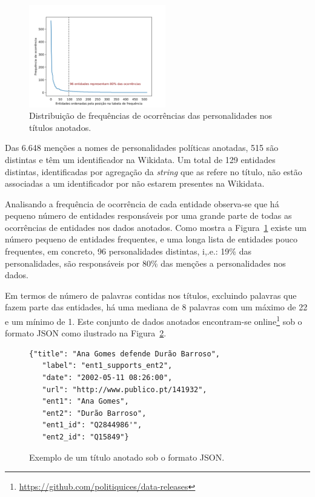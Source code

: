 \documentclass[a4paper, twocolumn, 11pt, twoside]{article}
\begin{document}


\begin{figure}
  \centering
    \includegraphics[width=0.53\textwidth]{power_law_ent_freq.png}
  \caption{Distribuição de frequências de ocorrências das personalidades nos títulos anotados.}
  \label{fig:ent_power_law}
\end{figure}

Das 6.648 menções a nomes de personalidades políticas anotadas, 515 são distintas e têm um identificador na Wikidata. Um total de 129 entidades distintas, identificadas por agregação da \textit{string} que as refere no título, não estão associadas a um identificador por não estarem presentes na Wikidata. 

Analisando a frequência de ocorrência de cada entidade observa-se que há pequeno número de entidades responsáveis por uma grande parte de todas as ocorrências de entidades nos dados anotados. Como mostra a Figura~\ref{fig:ent_power_law} existe um número pequeno de entidades frequentes, e uma longa lista de entidades pouco frequentes, em concreto, 96 personalidades distintas, i,.e.: 19\% das personalidades, são responsáveis por 80\% das menções a personalidades nos dados.

Em termos de número de palavras contidas nos títulos, excluindo palavras que fazem parte das entidades, há uma mediana de 8 palavras com um máximo de 22 e um mínimo de 1. Este conjunto de dados anotados encontram-se online\footnote{\url{https://github.com/politiquices/data-releases}} sob o formato JSON como ilustrado na Figura~\ref{fig:json_sample}.

\begin{figure}[!h]
\begin{Verbatim}[fontsize=\small]
  {"title": "Ana Gomes defende Durão Barroso",
   "label": "ent1_supports_ent2",
   "date": "2002-05-11 08:26:00",
   "url": "http://www.publico.pt/141932",
   "ent1": "Ana Gomes",
   "ent2": "Durão Barroso",
   "ent1_id": "Q2844986'",
   "ent2_id": "Q15849"}
\end{Verbatim}
  \caption{Exemplo de um título anotado sob o formato JSON.}
  \label{fig:json_sample}
\end{figure}
\end{document}
